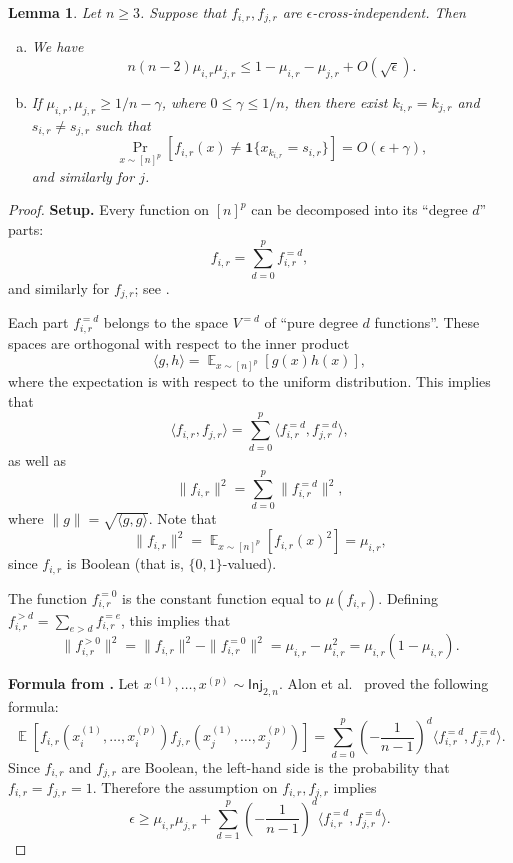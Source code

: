 \documentclass{article}
\providecommand{\Inj}{\mathsf{Inj}}
\providecommand{\ind}[1]{\mathbf1\{#1\}}
\DeclareMathOperator*{\Ex}{\mathbb{E}}
\newtheorem{lemma}[theorem]{Lemma}
\theoremstyle{definition}
\theoremstyle{remark}
\begin{document}
\begin{lemma}
\label{lem:adfs-approx}
Let $n \ge 3$. Suppose that $f_{i,r},f_{j,r}$ are $\epsilon$-cross-independent. Then
\begin{enumerate}[(a)]
\item We have
\label{itm:adfs-ub}
\[
 n(n-2) \mu_{i,r} \mu_{j,r} \leq 1 - \mu_{i,r} - \mu_{j,r} + O(\sqrt{\epsilon}).
\]
\item If $\mu_{i,r},\mu_{j,r} \ge 1/n - \gamma$, where $0 \leq \gamma \leq 1/n$, then there exist $k_{i,r} = k_{j,r}$ and $s_{i,r} \neq s_{j,r}$ such that
\[
 \Pr_{x \sim [n]^p}[f_{i,r}(x) \neq \ind{x_{k_{i,r}} = s_{i,r}}] = O(\epsilon + \gamma),
\]
and similarly for $j$.
\label{itm:adfs-stab}
\end{enumerate}
\end{lemma}
\begin{proof}
\textbf{Setup.}
Every function on $[n]^p$ can be decomposed into its ``degree $d$'' parts:
\[
 f_{i,r} = \sum_{d=0}^p f_{i,r}^{=d},
\]
and similarly for $f_{j,r}$; see \cite[Chapter 8]{ODonnell}.

Each part $f_{i,r}^{=d}$ belongs to the space $V^{=d}$ of ``pure degree $d$ functions''. These spaces are orthogonal with respect to the inner product
\[
 \langle g,h \rangle = \Ex_{x \sim [n]^p}[g(x) h(x)],
\]
where the expectation is with respect to the uniform distribution. This implies that
\[
 \langle f_{i,r}, f_{j,r} \rangle = \sum_{d=0}^p \langle f_{i,r}^{=d}, f_{j,r}^{=d} \rangle,
\]
as well as
\[
 \|f_{i,r}\|^2 = \sum_{d=0}^p \|f_{i,r}^{=d}\|^2,
\]
where $\|g\| = \sqrt{\langle g,g \rangle}$. Note that
\[
 \|f_{i,r}\|^2 = \Ex_{x \sim [n]^p}[f_{i,r}(x)^2] = \mu_{i,r},
\]
since $f_{i,r}$ is Boolean (that is, $\{0,1\}$-valued).

The function $f_{i,r}^{=0}$ is the constant function equal to $\mu(f_{i,r})$. Defining $f_{i,r}^{>d} = \sum_{e>d} f_{i,r}^{=e}$, this implies that
\[
 \|f_{i,r}^{>0}\|^2 = \|f_{i,r}\|^2 - \|f_{i,r}^{=0}\|^2 = \mu_{i,r} - \mu_{i,r}^2 = \mu_{i,r} (1 - \mu_{i,r}).
\]

\smallskip
\textbf{Formula from \cite{ADFS}.} Let $x^{(1)},\dots,x^{(p)} \sim \Inj_{2,n}$. Alon et al.~\cite[Claim 4.3]{ADFS} proved the following formula:
\[
\Ex[f_{i,r}(x^{(1)}_i,\dots,x^{(p)}_i) f_{j,r}(x^{(1)}_j,\dots,x^{(p)}_j)] = \sum_{d=0}^p \left(-\frac{1}{n-1}\right)^d \langle f_{i,r}^{=d}, f_{j,r}^{=d} \rangle.
\]
Since $f_{i,r}$ and $f_{j,r}$ are Boolean, the left-hand side is the probability that $f_{i,r} = f_{j,r} = 1$. Therefore the assumption on $f_{i,r},f_{j,r}$ implies
\begin{equation} \label{eq:adfs}
\epsilon \ge \mu_{i,r} \mu_{j,r} + \sum_{d=1}^p \left(-\frac{1}{n-1}\right)^d \langle f_{i,r}^{=d}, f_{j,r}^{=d} \rangle.
\end{equation}


\end{proof}
\end{document}
